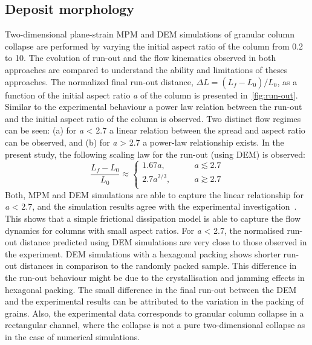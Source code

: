 \subsection{Deposit morphology}
Two-dimensional plane-strain MPM and DEM simulations of granular column 
collapse are performed by varying the initial aspect ratio of the column from 
0.2 to 10. The evolution of run-out and the flow kinematics observed in both 
approaches are compared to understand the ability and limitations of theses 
approaches. The normalized final run-out distance, $\Delta L = 
(L_{\textit{f}}-L_{\textit{0}})/L_{\textit{0}}$, as a function of the initial 
aspect ratio \textit{a} of the column is presented in~\cref{fig:run-out}. 
Similar to the experimental behaviour a power law relation between the run-out 
and the initial aspect ratio of the column is observed. Two distinct flow 
regimes can be seen: (a) for \textit{a} < 2.7 a linear relation between the 
spread and aspect ratio can be observed, and (b) for \textit{a} > 2.7 a 
power-law relationship exists. In the present study, the following scaling law 
for the run-out (using DEM) is observed:
%
\begin{equation}
\frac{L_{\textit{f}}-L_{\textit{0}}}{L_{\textit{0}}} \approx  
\begin{cases}
1.67 a, &\qquad \textit{a}\lesssim 2.7 \\
2.7 a^{2/3}, &\qquad \textit{a} \gtrsim 2.7 \\
\end{cases}
\end{equation}
Both, MPM and DEM simulations are able to capture the linear relationship for 
\textit{a} < 2.7, and the simulation results agree with the experimental 
investigation~\citep{Lajeunesse2005}. This shows that a simple frictional 
dissipation model is able to capture the flow dynamics for columns with small 
aspect ratios. For \textit{a} < 2.7, the normalised run-out distance predicted 
using DEM simulations are very close to those observed in the experiment. DEM 
simulations with a hexagonal packing shows shorter run-out distances in 
comparison to the randomly packed sample. This difference in the run-out 
behaviour might be due to the crystallisation and jamming effects in hexagonal 
packing. The small difference in the final run-out between the DEM and the 
experimental results can be attributed to the variation in the packing of 
grains. Also, the experimental data corresponds to granular column collapse in 
a rectangular channel, where the collapse is not a pure two-dimensional 
collapse as in the case of numerical simulations. 

